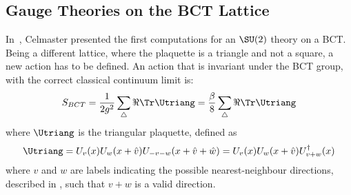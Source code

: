 \subsection{Gauge Theories on the BCT Lattice}
In~\cite{Celmaster:1982ht}, Celmaster presented the first computations for an $\SU(2)$ theory on a BCT.
Being a different lattice, where the plaquette is a triangle and not a square, a new action has to be defined. An action that is invariant under the BCT group, with the correct classical continuum limit is:
\begin{equation}
    S_{BCT} = \frac1{2g^2} \sum_\bigtriangleup \Re\Tr \Utriang = \frac\beta8 \sum_\bigtriangleup \Re\Tr \Utriang \label{3:BCTAction}
\end{equation}
where $\Utriang$ is the triangular plaquette, defined as
\begin{equation}
    \Utriang = U_v(x)U_w(x+\hat{v})U_{-v-w}(x+\hat{v}+\hat{w}) = U_v(x)U_w(x+\hat{v})U^\dagger_{v+w}(x) \label{3:PlaqTriang}
\end{equation}
where $v$ and $w$ are labels indicating the possible nearest-neighbour directions, described in , such that $v+w$ is a valid direction.
\begin{comment}
\begin{figure}[!hbtp]
    \centering
    \begin{tikzpicture}
        \filldraw[black]  (0,0) circle (3pt) node[anchor=north east]{$x$};
        \filldraw[black]  (2,0) circle (3pt) node[anchor=north west]{$x+\hat{v}$};
        \filldraw[black]  (1,1.732) circle (3pt) node[anchor=south]{$x+\hat{v}+\hat{w}$};
        \draw[ultra thick,->] (0,0) -- (1,0) node[anchor=north]{$U_v(x)$};
        \draw[ultra thick   ] (1,0) -- (2,0);
        \draw[ultra thick,->] (2,0) -- (1.5,0.866) node[anchor=south west]{$U_w(x+\hat{v})$};
        \draw[ultra thick   ] (1.5,0.866) -- (1,1.732);
        \draw[ultra thick,->] (1,1.732) -- (0.5,0.866) node[anchor=south east]{$U^\dagger_{v+w}(x)$};
        \draw[ultra thick   ] (0.5,0.866) -- (0,0);
    \end{tikzpicture}
    \caption{Schematization of an elementary triangular plaquette.}
    \label{3F:PlaqTriang}
\end{figure}\\
\end{comment}
